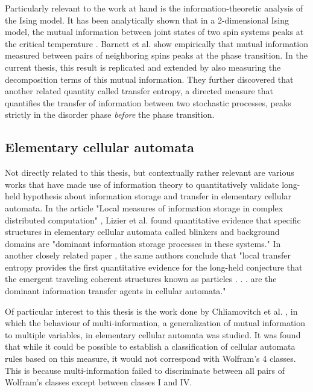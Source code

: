 \documentclass[12pt]{article}
\begin{document}
Particularly relevant to the work at hand is the information-theoretic analysis of the Ising model. It has been analytically shown that in a 2-dimensional Ising model, the mutual information between joint states of two spin systems peaks at the critical temperature \cite{mi-ising-analytic}. Barnett et al. \cite{barnett-ising} show empirically that mutual information measured between pairs of neighboring spins peaks at the phase transition. In the current thesis, this result is replicated and extended by also measuring the decomposition terms of this mutual information. They  further discovered that another related quantity called transfer entropy, a directed measure that quantifies the transfer of information between two stochastic processes, peaks strictly in the disorder phase \textit{before} the phase transition. 

\subsection{Elementary cellular automata}

Not directly related to this thesis, but contextually rather relevant are various works that have made use of information theory to quantitatively validate long-held hypothesis about information storage and transfer in elementary cellular automata. In the article "Local measures of information storage in complex distributed computation" \cite{active-inf-storage}, Lizier et al. found quantitative evidence that specific structures in elementary cellular automata called blinkers and background domains are "dominant information storage processes in these systems." In another closely related paper \cite{local-transfer-entropy-ca}, the same authors conclude that "local transfer entropy provides the first quantitative evidence for the long-held conjecture that the emergent traveling coherent structures known as particles . . . are the dominant information transfer agents in cellular automata."

Of particular interest to this thesis is the work done by Chliamovitch et al. \cite{multi-inf-ca}, in which the behaviour of multi-information, a generalization of mutual information to multiple variables, in elementary cellular automata was studied. It was found that while it could be possible to establish a classification of cellular automata rules based on this measure, it would not correspond with Wolfram's 4 classes. This is because multi-information failed to discriminate between all pairs of Wolfram's classes except between classes I and IV.
\end{document}
